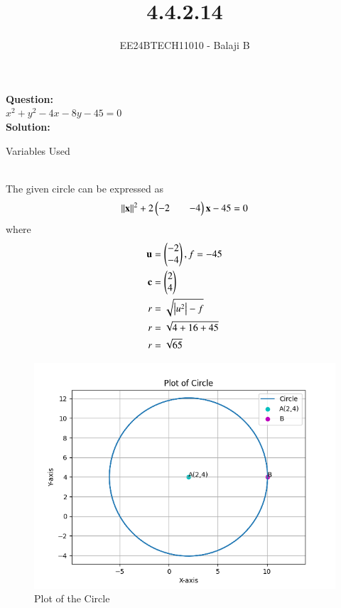 \documentclass[journal]{IEEEtran}
\begin{document}

\vspace{3cm}

\title{4.4.2.14}
\author{EE24BTECH11010 - Balaji B}
{\let\newpage\relax\maketitle}
\textbf{Question:}\\
$x^2 + y^2 - 4x - 8y - 45 = 0$ \\
\textbf{Solution:}\\
\begin{table}[h!]    
  \centering
  
  \caption{Variables Used}
  \label{tab1-1.9-6}
  \end{table}\\
  The given circle can be expressed as \\
  \begin{align}
      \left\lVert\mathbf{x}\right\rVert^2 +2\begin{pmatrix}-2 && -4\end{pmatrix}\mathbf{x} - 45 = 0
  \end{align}
  where 
  \begin{align}
      \mathbf{u} &= \begin{pmatrix}-2 \\ -4\end{pmatrix}, f = -45 \\
       \mathbf{c} &= \begin{pmatrix}2 \\ 4\end{pmatrix}\\
      r &= \sqrt{\left\vert u^2\right\vert - f} \\
      r &= \sqrt{4 + 16 + 45} \\
      r &= \sqrt{65}
  \end{align}

  \begin{figure}[h!]
  \centering
  \includegraphics[width=0.7\linewidth]{figs/fig.png}
  \caption{Plot of the Circle}
   \label{stemplot}
\end{figure}
\end{document}
